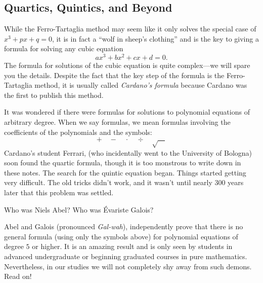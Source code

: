 \subsection{Quartics, Quintics, and Beyond}

While the Ferro-Tartaglia method may seem like it only solves the
special case of $x^3 + px +q = 0$, it is in fact a ``wolf in sheep's
clothing'' and is the key to giving a
formula for solving any cubic equation
\[
ax^3 + bx^2 + cx +d = 0.
\]
The formula for solutions of the cubic equation is quite complex---we
will spare you the details. Despite the fact that the key step of the
formula is the Ferro-Tartaglia method, it is usually called
\textit{Cardano's formula} because Cardano
was the first to publish this method.

It was wondered if there were formulas for solutions to polynomial
equations of arbitrary degree. When we say formulas, we mean formulas
involving the coefficients of the polynomials and the symbols:
\[
+\quad -\quad \cdot\quad \div \quad \sqrt{\hspace{1em}}
\]
Cardano's student Ferrari, (who incidentally went to the University of
Bologna) soon found the quartic formula, though it is too monstrous to
write down in these notes. The search for the quintic equation
began. Things started getting very difficult. The old tricks didn't
work, and it wasn't until nearly 300 years later that this problem was
settled.

\begin{question} 
Who was Niels Abel? Who was \'{E}variste
Galois?
\end{question}
\QM

Abel and Galois (pronounced \textit{Gal-wah}), independently prove
that there is no general formula (using only the symbols above) for
polynomial equations of degree $5$ or higher. It is an amazing result
and is only seen by students in advanced undergraduate or beginning
graduated courses in pure mathematics. Nevertheless, in our studies we
will not completely shy away from such demons. Read on!






\newpage

